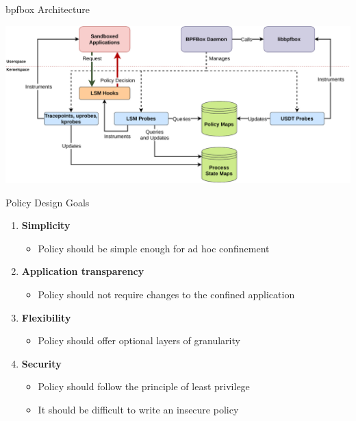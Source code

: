 \documentclass[12pt, dvipsnames]{beamer}
\begin{document}
\begin{frame}[c]{bpfbox Architecture}
\begin{center}
    \color{black}
    \includegraphics[width=1\textwidth]{figs/bpfbox-overview.pdf}
\end{center}
\end{frame}


\begin{frame}[c]{Policy Design Goals}
\begin{enumerate}
    \item \textbf{Simplicity}
    \begin{itemize}
        \item Policy should be simple enough for ad hoc confinement
    \end{itemize}
    \vfill
    \item \textbf{Application transparency}
    \begin{itemize}
        \item Policy should not require changes to the confined application
    \end{itemize}
    \vfill
    \item \textbf{Flexibility}
    \begin{itemize}
        \item Policy should offer optional layers of granularity
    \end{itemize}
    \vfill
    \item \textbf{Security}
    \begin{itemize}
        \item Policy should follow the principle of least privilege
        \item It should be difficult to write an insecure policy
    \end{itemize}
\end{enumerate}
\end{frame}
\end{document}
